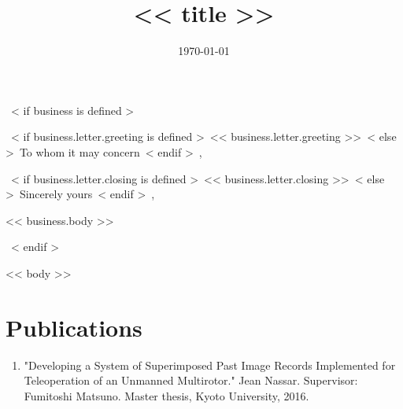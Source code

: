 \documentclass[<< theme.font_size >>]{moderncv}
\title{<< title >>}
\begin{document}
~< if business is defined >~
\date{\today}
\opening{~< if business.letter.greeting is defined >~<< business.letter.greeting >>~< else >~To whom it may concern~< endif >~,}
\closing{~< if business.letter.closing is defined >~<< business.letter.closing >>~< else >~Sincerely yours~< endif >~,}

\makelettertitle            %
<< business.body >>

\makeletterclosing          %
\newpage
\setcounter{page}{1}
~< endif >~


\makecvtitle
\vspace{-20pt}


<< body >>

\section{Publications}
\begin{enumerate}
\item "Developing a System of Superimposed Past Image Records Implemented for Teleoperation of an Unmanned Multirotor."%
    Jean Nassar. Supervisor: Fumitoshi Matsuno. Master thesis, Kyoto University, 2016.
\end{enumerate}
\end{document}
